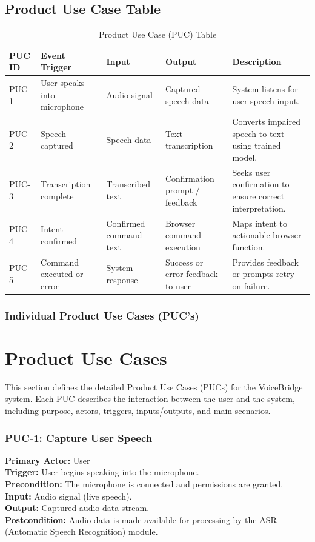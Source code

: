 \documentclass[11pt]{article}
\begin{document}
\subsection{Product Use Case Table}
\begin{table}[H]
\centering
\caption{Product Use Case (PUC) Table}
\begin{tabularx}{\textwidth}{p{1.5cm}p{3cm}p{2.5cm}p{3cm}X}
\toprule
\textbf{PUC ID} & \textbf{Event Trigger} & \textbf{Input} & \textbf{Output} & \textbf{Description} \\
\midrule
PUC-1 & User speaks into microphone & Audio signal & Captured speech data & System listens for user speech input. \\
PUC-2 & Speech captured & Speech data & Text transcription & Converts impaired speech to text using trained model. \\
PUC-3 & Transcription complete & Transcribed text & Confirmation prompt / feedback & Seeks user confirmation to ensure correct interpretation. \\
PUC-4 & Intent confirmed & Confirmed command text & Browser command execution & Maps intent to actionable browser function. \\
PUC-5 & Command executed or error & System response & Success or error feedback to user & Provides feedback or prompts retry on failure. \\
\bottomrule
\end{tabularx}
\end{table}

\subsubsection{Individual Product Use Cases (PUC's)}
\section*{Product Use Cases}

This section defines the detailed Product Use Cases (PUCs) for the VoiceBridge system. Each PUC describes the interaction between the user and the system, including purpose, actors, triggers, inputs/outputs, and main scenarios.

\subsubsection*{PUC-1: Capture User Speech}
\textbf{Primary Actor:} User \\
\textbf{Trigger:} User begins speaking into the microphone. \\
\textbf{Precondition:} The microphone is connected and permissions are granted. \\
\textbf{Input:} Audio signal (live speech). \\
\textbf{Output:} Captured audio data stream. \\
\textbf{Postcondition:} Audio data is made available for processing by the ASR (Automatic Speech Recognition) module. \\
\end{document}
